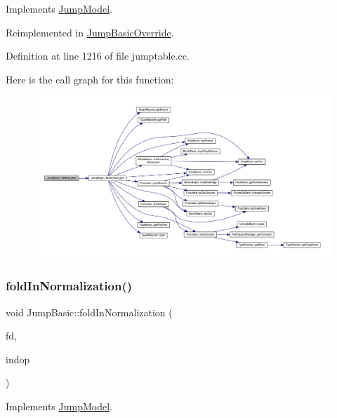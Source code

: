 Implements \mbox{\hyperlink{class_jump_model_a6f40ba77ddc8f4cf40f6071248103d9c}{Jump\+Model}}.



Reimplemented in \mbox{\hyperlink{class_jump_basic_override_a65b9faa5ee96e07e8a90ce492bc8c179}{Jump\+Basic\+Override}}.



Definition at line 1216 of file jumptable.\+cc.

Here is the call graph for this function\+:
\nopagebreak
\begin{figure}[H]
\begin{center}
\leavevmode
\includegraphics[width=350pt]{class_jump_basic_ae70d6baeeecb4b16e79de8516868ffe4_cgraph}
\end{center}
\end{figure}
\mbox{\label{class_jump_basic_a4f3c7e75f6b89afd01e64950959e114d}} 
\subsubsection{\texorpdfstring{foldInNormalization()}{foldInNormalization()}}
{\footnotesize\ttfamily void Jump\+Basic\+::fold\+In\+Normalization (\begin{DoxyParamCaption}\item[{\mbox{\hyperlink{class_funcdata}{Funcdata}} $\ast$}]{fd,  }\item[{\mbox{\hyperlink{class_pcode_op}{Pcode\+Op}} $\ast$}]{indop }\end{DoxyParamCaption})\hspace{0.3cm}{\ttfamily [virtual]}}



Implements \mbox{\hyperlink{class_jump_model_a8c346de087366515ed90ba1d27012451}{Jump\+Model}}.



